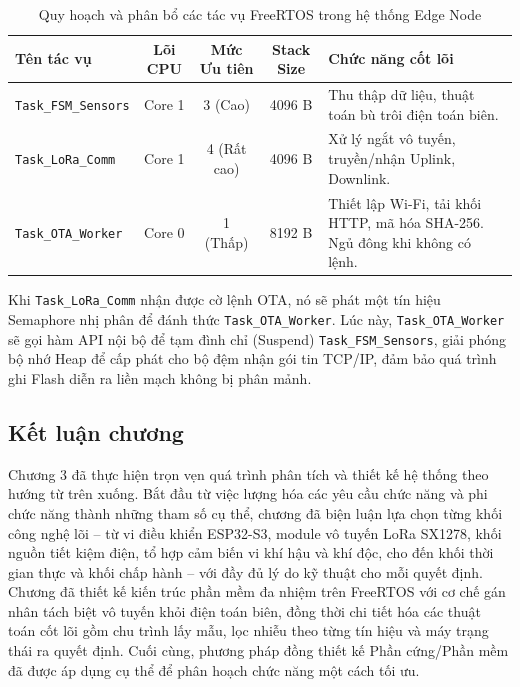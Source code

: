 \begin{table}[H]
  \centering
  \caption{Quy hoạch và phân bổ các tác vụ FreeRTOS trong hệ thống Edge Node}
  \label{tab:rtos_tasks}
  \begin{tabular}{@{}p{3.5cm} c c c p{4.5cm}@{}}
      \toprule
      \textbf{Tên tác vụ} & \textbf{Lõi CPU} & \textbf{Mức Ưu tiên} & \textbf{Stack Size} & \textbf{Chức năng cốt lõi} \\
      \midrule
      \texttt{Task\_FSM\_Sensors} & Core 1 & 3 (Cao) & 4096 B & Thu thập dữ liệu, thuật toán bù trôi điện toán biên. \\
      \midrule
      \texttt{Task\_LoRa\_Comm} & Core 1 & 4 (Rất cao) & 4096 B & Xử lý ngắt vô tuyến, truyền/nhận Uplink, Downlink. \\
      \midrule
      \texttt{Task\_OTA\_Worker} & Core 0 & 1 (Thấp) & 8192 B & Thiết lập Wi-Fi, tải khối HTTP, mã hóa SHA-256. Ngủ đông khi không có lệnh. \\
      \bottomrule
  \end{tabular}
\end{table}

Khi \texttt{Task\_LoRa\_Comm} nhận được cờ lệnh OTA, nó sẽ phát một tín hiệu Semaphore nhị phân để đánh thức \texttt{Task\_OTA\_Worker}. Lúc này, \texttt{Task\_OTA\_Worker} sẽ gọi hàm API nội bộ để tạm đình chỉ (Suspend) \texttt{Task\_FSM\_Sensors}, giải phóng bộ nhớ Heap để cấp phát cho bộ đệm nhận gói tin TCP/IP, đảm bảo quá trình ghi Flash diễn ra liền mạch không bị phân mảnh.

\subsection{Kết luận chương}
Chương 3 đã thực hiện trọn vẹn quá trình phân tích và thiết kế hệ thống theo hướng từ trên xuống. Bắt đầu từ việc lượng hóa các yêu cầu chức năng và phi chức năng thành những tham số cụ thể, chương đã biện luận lựa chọn từng khối công nghệ lõi -- từ vi điều khiển ESP32-S3, module vô tuyến LoRa SX1278, khối nguồn tiết kiệm điện, tổ hợp cảm biến vi khí hậu và khí độc, cho đến khối thời gian thực và khối chấp hành -- với đầy đủ lý do kỹ thuật cho mỗi quyết định. Chương đã thiết kế kiến trúc phần mềm đa nhiệm trên FreeRTOS với cơ chế gán nhân tách biệt vô tuyến khỏi điện toán biên, đồng thời chi tiết hóa các thuật toán cốt lõi gồm chu trình lấy mẫu, lọc nhiễu theo từng tín hiệu và máy trạng thái ra quyết định. Cuối cùng, phương pháp đồng thiết kế Phần cứng/Phần mềm đã được áp dụng cụ thể để phân hoạch chức năng một cách tối ưu. 




